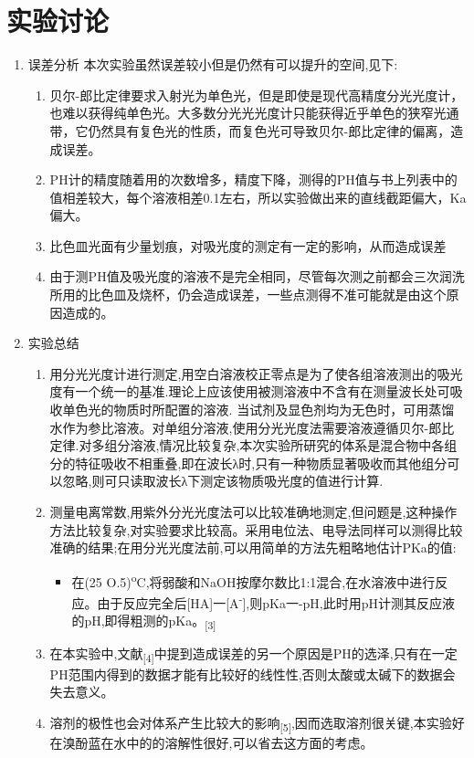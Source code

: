 \documentclass[11pt]{report}
\begin{document}
\section{实验讨论}
\label{sec:orgf1548ac}
\begin{enumerate}
\item 误差分析
\label{sec:orgfa68678}
本次实验虽然误差较小但是仍然有可以提升的空间,见下:
\begin{enumerate}
\item 贝尔-郎比定律要求入射光为单色光，但是即使是现代高精度分光光度计，也难以获得纯单色光。大多数分光光光度计只能获得近乎单色的狭窄光通带，它仍然具有复色光的性质，而复色光可导致贝尔-郎比定律的偏离，造成误差。
\item PH计的精度随着用的次数增多，精度下降，测得的PH值与书上列表中的值相差较大，每个溶液相差0.1左右，所以实验做出来的直线截距偏大，Ka偏大。
\item 比色皿光面有少量划痕，对吸光度的测定有一定的影响，从而造成误差
\item 由于测PH值及吸光度的溶液不是完全相同，尽管每次测之前都会三次润洗所用的比色皿及烧杯，仍会造成误差，一些点测得不准可能就是由这个原因造成的。
\end{enumerate}
\item 实验总结
\label{sec:org68bcd41}
\begin{enumerate}
\item 用分光光度计进行测定,用空白溶液校正零点是为了使各组溶液测出的吸光度有一个统一的基准.理论上应该使用被测溶液中不含有在测量波长处可吸收单色光的物质时所配置的溶液. 当试剂及显色剂均为无色时，可用蒸馏水作为参比溶液。对单组分溶液,使用分光光度法需要溶液遵循贝尔-郎比定律.对多组分溶液,情况比较复杂,本次实验所研究的体系是混合物中各组分的特征吸收不相重叠,即在波长λ时,只有一种物质显著吸收而其他组分可以忽略,则可只读取波长λ下测定该物质吸光度的值进行计算.
\item 测量电离常数,用紫外分光光度法可以比较准确地测定,但问题是,这种操作方法比较复杂,对实验要求比较高。采用电位法、电导法同样可以测得比较准确的结果;在用分光光度法前,可以用简单的方法先粗略地估计PKa的值:
\begin{itemize}
\item 在(25\textpm{} O.5)\textsuperscript{o}C,将弱酸和NaOH按摩尔数比1:1混合,在水溶液中进行反应。由于反应完全后[HA]一[A\textsuperscript{-}],则pKa一-pH,此时用pH计测其反应液的pH,即得粗测的pKa。\textsubscript{[3]}
\end{itemize}
\item 在本实验中,文献\textsubscript{[4]}中提到造成误差的另一个原因是PH的选泽,只有在一定PH范围内得到的数据才能有比较好的线性性,否则太酸或太碱下的数据会失去意义。
\item 溶剂的极性也会对体系产生比较大的影响\textsubscript{[5]},因而选取溶剂很关键,本实验好在溴酚蓝在水中的的溶解性很好,可以省去这方面的考虑。
\end{enumerate}
\end{enumerate}
\end{document}
